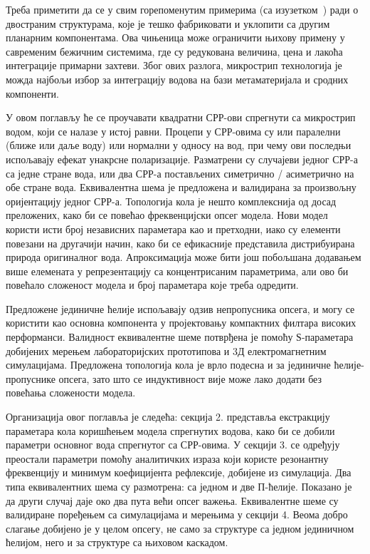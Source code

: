 \documentclass[main.tex]{subfiles}
\begin{document}
Треба приметити да се у свим горепоменутим примерима (са изузетком~\cite{bib16}) ради о двостраним структурама, које је тешко фабриковати и уклопити са другим планарним компонентама. Ова чињеница може ограничити њихову примену у савременим бежичним системима, где су редукована величина, цена и лакоћа интеграције примарни захтеви. Због ових разлога, микрострип технологија је можда најбољи избор за интеграцију водова на бази метаматеријала и сродних компоненти.

У овом поглављу ће се проучавати квадратни СРР-ови спрегнути са микрострип водом, који се налазе у истој равни. Процепи у СРР-овима су или паралелни (ближе или даље воду) или нормални у односу на вод, при чему ови последњи испољавају ефекат унакрсне поларизације. Разматрени су случајеви једног СРР-а са једне стране вода, или два СРР-а постављених симетрично / асиметрично на обе стране вода. Еквивалентна шема је предложена и валидирана за произвољну оријентацију једног СРР-а. Топологија кола је нешто комплекснија од досад преложених, како би се повећао фреквенцијски опсег модела. Нови модел користи исти број независних параметара као и претходни, иако су елементи повезани на другачији начин, како би се ефикасније представила дистрибуирана природа оригиналног вода. Апроксимација може бити још побољшана додавањем више елемената у репрезентацију са концентрисаним параметрима, али ово би повећало сложеност модела и број параметара које треба одредити.

Предложене јединичне ћелије испољавају одзив непропусника опсега, и могу се користити као основна компонента у пројектовању компактних филтара високих перформанси. Валидност еквивалентне шеме потврђена је помоћу $Ѕ$-параметара добијених мерењем лабораторијских прототипова и 3Д електромагнетним симулацијама. Предложена топологија кола је врло подесна и за јединичне ћелије-пропуснике опсега, зато што се индуктивност вије може лако додати без повећања сложености модела.

Организација овог поглавља је следећа: секција 2. представља екстракцију параметара кола коришћењем модела спрегнутих водова, како би се добили параметри основног вода спрегнутог са СРР-овима. У секцији 3. се одређују преостали параметри помоћу аналитичких израза који користе резонантну фреквенцију и минимум коефицијента рефлексије, добијене из симулација. Два типа еквивалентних шема су размотрена: са једном и две П-ћелије. Показано је да други случај даје око два пута већи опсег важења. Еквивалентне шеме су валидиране поређењем са симулацијама и мерењима у секцији 4. Веома добро слагање добијено је у целом опсегу, не само за структуре са једном јединичном ћелијом, него и за структуре са њиховом каскадом.
\end{document}

